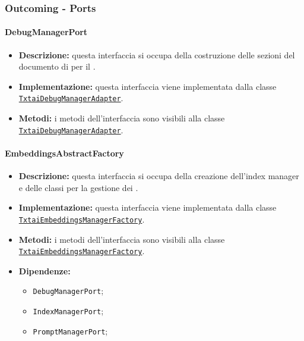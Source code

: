 \subsubsection{Outcoming - Ports}

\paragraph{DebugManagerPort} \label{DebugManagerPort}
\begin{itemize}
    \item \textbf{Descrizione:} questa interfaccia si occupa della costruzione delle sezioni del documento di  per il .
    \item \textbf{Implementazione:} questa interfaccia viene implementata dalla classe \hyperref[TxtaiDebugManagerAdapter]{\texttt{TxtaiDebugManagerAdapter}}.
    \item \textbf{Metodi:} i metodi dell'interfaccia sono visibili alla classe \hyperref[TxtaiDebugManagerAdapter]{\texttt{TxtaiDebugManagerAdapter}}.
\end{itemize}  

\paragraph{EmbeddingsAbstractFactory} \label{EmbeddingsAbstractFactory}
\begin{itemize}
    \item \textbf{Descrizione:} questa interfaccia si occupa della creazione dell'index manager e delle classi per la gestione dei .
    \item \textbf{Implementazione:} questa interfaccia viene implementata dalla classe \hyperref[TxtaiEmbeddingsManagerFactory]{\texttt{TxtaiEmbeddingsManagerFactory}}.
    \item \textbf{Metodi:} i metodi dell'interfaccia sono visibili alla classe \hyperref[TxtaiEmbeddingsManagerFactory]{\texttt{TxtaiEmbeddingsManagerFactory}}.
    \item \textbf{Dipendenze:}
    \begin{itemize}
        \item \texttt{DebugManagerPort};
        \item \texttt{IndexManagerPort};
        \item \texttt{PromptManagerPort};
    \end{itemize}
\end{itemize}  

